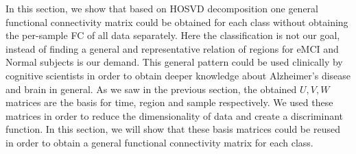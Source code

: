 \documentclass[preprint,12pt]{elsarticle}
\begin{document}
	In this section, we show that based on HOSVD decomposition one general functional connectivity matrix could be obtained for each class without obtaining the per-sample FC of all data separately. Here the classification is not our goal, instead of finding a general and representative
	relation of regions for eMCI and Normal subjects is our demand. This general pattern could be used clinically by cognitive scientists in order to obtain deeper knowledge about Alzheimer's disease and brain in general.
	As we saw in the previous section, the obtained $U, V, W$ matrices are the basis for time, region and sample respectively. We used these matrices in order to reduce the dimensionality of data and create a discriminant function. In this section, we will show that these basis matrices could be reused in order to obtain a general functional connectivity matrix for each class.  
	
\end{document}
